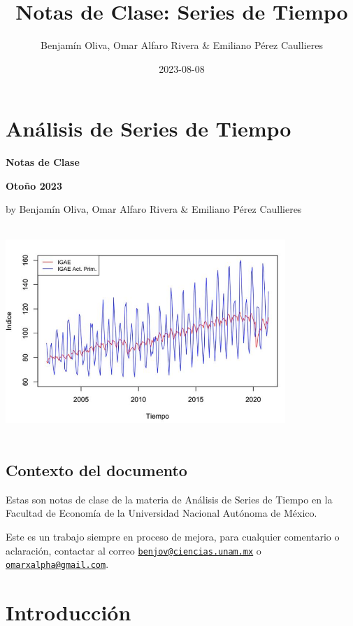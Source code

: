 \documentclass[
]{book}
\title{Notas de Clase: Series de Tiempo}
\author{Benjamín Oliva, Omar Alfaro Rivera \& Emiliano Pérez Caullieres}
\date{2023-08-08}
\begin{document}
\maketitle

{
\setcounter{tocdepth}{1}
\tableofcontents
}
\hypertarget{anuxe1lisis-de-series-de-tiempo}{%
\chapter*{Análisis de Series de Tiempo}\label{anuxe1lisis-de-series-de-tiempo}}

\textbf{Notas de Clase}

\textbf{Otoño 2023}

by Benjamín Oliva, Omar Alfaro Rivera \& Emiliano Pérez Caullieres

\includegraphics[width=4.16667in,height=3.125in]{Portada.png}

\hypertarget{contexto-del-documento}{%
\section*{Contexto del documento}\label{contexto-del-documento}}

Estas son notas de clase de la materia de Análisis de Series de Tiempo en la Facultad de Economía de la Universidad Nacional Autónoma de México.

Este es un trabajo siempre en proceso de mejora, para cualquier comentario o aclaración, contactar al correo \href{mailto:benjov@ciencias.unam.mx}{\nolinkurl{benjov@ciencias.unam.mx}} o \href{mailto:omarxalpha@gmail.com}{\nolinkurl{omarxalpha@gmail.com}}.

\hypertarget{introducciuxf3n}{%
\chapter{Introducción}\label{introducciuxf3n}}
\end{document}
